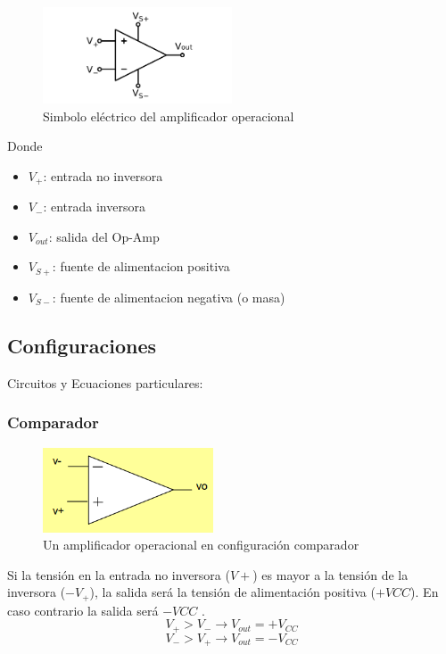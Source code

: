 \documentclass[../main.tex]{subfiles}
\begin{document}
	\begin{figure}[H]
		\centering
		\includegraphics[width=0.5\textwidth]{imagen1.png}
		\caption{Simbolo eléctrico del amplificador operacional}
	\end{figure}

	Donde
	\begin{itemize}
		\item $V_+$: entrada no inversora
		\item $V_-$: entrada inversora
		\item $V_{out}$: salida del Op-Amp
		\item $V_{S+}$: fuente de alimentacion positiva
		\item $V_{S-}$: fuente de alimentacion negativa (o masa)
	\end{itemize}

\clearpage
	\subsection{Configuraciones}
	Circuitos y Ecuaciones particulares:
		\subsubsection{Comparador}
		\begin{figure}[H]
			\centering
			\includegraphics[width=0.45\textwidth]{imagen2.png}
			\caption{Un amplificador operacional en configuración comparador}
		\end{figure}
		Si la tensión en la entrada no inversora ($V+$) es mayor a la tensión de la inversora
		($-V_+$), la salida será la tensión de alimentación positiva ($+VCC$). En caso
		contrario la salida será $-VCC$ .
		\[
			V_+ > V_- \longrightarrow V_{out} = +V_{CC}
		\]
		\[
			V_- > V_+ \longrightarrow V_{out} = -V_{CC}
		\]
\end{document}
